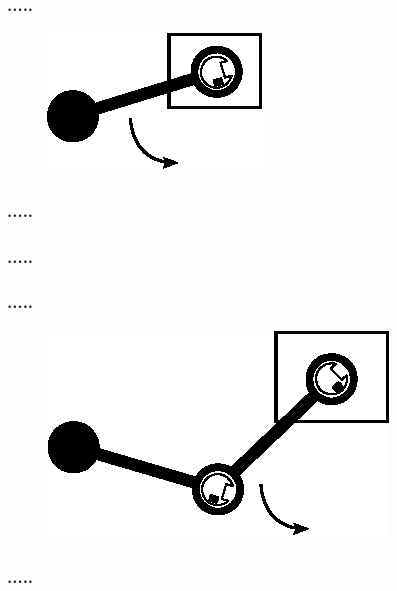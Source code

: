 \documentclass[mathserif]{beamer}
\begin{document}
\begin{frame}[c]\frametitle{.....}
    \begin{figure}[h]
		\centering
		\includegraphics[width=.5\linewidth]{graphics/single_pendulum}
	\end{figure}
\end{frame}

\begin{frame}[c]\frametitle{.....}
    \begin{figure}[h]
		\centering
		
	\end{figure}
\end{frame}

\begin{frame}[c]\frametitle{.....}
    \begin{figure}[h]
		\centering
		
	\end{figure}
\end{frame}

\begin{frame}[c]\frametitle{.....}
    \begin{figure}[h]
		\centering
		\includegraphics[width=.75\linewidth]{graphics/double_pendulum}
	\end{figure}
\end{frame}

\begin{frame}[c]\frametitle{.....}
    \begin{figure}[h]
		\centering
		
	\end{figure}
\end{frame}
\end{document}
